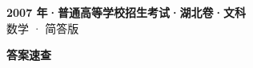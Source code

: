 \documentclass[zihao=-4, a4paper]{ctexart}
\begin{document}
\begin{center}
  {\Large\bfseries 2007 年·普通高等学校招生考试·湖北卷·文科}\\[4pt]
  {\large 数学 · 简答版}
\end{center}
\medskip
{}

\clearpage
{}
\begin{center}{\Large\bfseries 答案速查}\end{center}
\medskip

\end{document}
